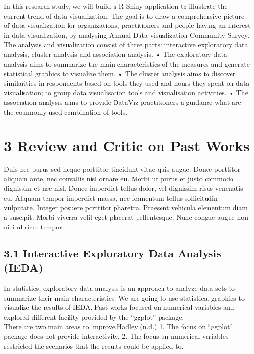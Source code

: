 \documentclass{acm_proc_article-sp}
\begin{document}
In this research study, we will build a R Shiny application to
illustrate the current trend of data visualization. The goal is to draw
a comprehensive picture of data visualization for organizations,
practitioners and people having an interest in data visualization, by
analysing Annual Data visualization Community Survey. The analysis and
visualization consist of three parts: interactive exploratory data
analysis, cluster analysis and association analysis. • The exploratory
data analysis aims to summarize the main characteristics of the measures
and generate statistical graphics to visualize them. • The cluster
analysis aims to discover similarities in respondents based on tools
they used and hours they spent on data visualisation; to group data
visualisation tools and visualisation activities. • The association
analysis aims to provide DataViz practitioners a guidance what are the
commonly used combination of tools.

\hypertarget{review-and-critic-on-past-works}{%
\section{3 Review and Critic on Past
Works}\label{review-and-critic-on-past-works}}

Duis nec purus sed neque porttitor tincidunt vitae quis augue. Donec
porttitor aliquam ante, nec convallis nisl ornare eu. Morbi ut purus et
justo commodo dignissim et nec nisl. Donec imperdiet tellus dolor, vel
dignissim risus venenatis eu. Aliquam tempor imperdiet massa, nec
fermentum tellus sollicitudin vulputate. Integer posuere porttitor
pharetra. Praesent vehicula elementum diam a suscipit. Morbi viverra
velit eget placerat pellentesque. Nunc congue augue non nisi ultrices
tempor.

\hypertarget{interactive-exploratory-data-analysis-ieda}{%
\subsection{3.1 Interactive Exploratory Data Analysis
(IEDA)}\label{interactive-exploratory-data-analysis-ieda}}

In statistics, exploratory data analysis is an approach to analyze data
sets to summarize their main characteristics. We are going to use
statistical graphics to visualize the results of IEDA. Past works
focused on numerical variables and explored different facility provided
by the ``ggplot'' package.\\
There are two main areas to improve.Hadley (n.d.) 1. The focus on
``ggplot'' package does not provide interactivity. 2. The focus on
numerical variables restricted the scenarios that the results could be
applied to.
\end{document}
